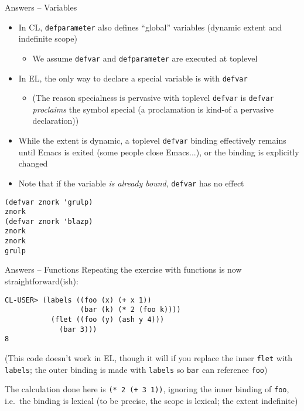 \documentclass[presentation]{beamer}
\begin{document}
\begin{frame}[fragile]{Answers -- Variables}
  \begin{itemize}
  \item In CL, \texttt{defparameter} also defines ``global'' variables (dynamic extent and indefinite scope)
    \begin{itemize}
    \item We assume \texttt{defvar} and \texttt{defparameter} are executed at toplevel
    \end{itemize}
  \item In EL, the only way to declare a special variable is with \texttt{defvar}
    \begin{itemize}
    \item (The reason specialness is pervasive with toplevel \texttt{defvar} is \texttt{defvar} \emph{proclaims} the symbol special (a proclamation is kind-of a pervasive declaration))
    \end{itemize}
  \item While the extent is dynamic, a toplevel \texttt{defvar} binding effectively remains until Emacs is exited (some people close Emacs...), or the binding is explicitly changed
  \item Note that if the variable \emph{is already bound}, \texttt{defvar} has no effect
  \end{itemize}
\begin{verbatim}
(defvar znork 'grulp)
znork
(defvar znork 'blazp)
znork
znork
grulp
\end{verbatim}
\end{frame}


\begin{frame}[fragile]{Answers -- Functions}
Repeating the exercise with functions is now straightforward(ish):
\begin{verbatim}
CL-USER> (labels ((foo (x) (+ x 1))
                  (bar (k) (* 2 (foo k))))
           (flet ((foo (y) (ash y 4)))
             (bar 3)))
8
\end{verbatim}
(This code doesn't work in EL, though it will if you replace the inner \texttt{flet} with \texttt{labels}; the outer binding is made with \texttt{labels} so \texttt{bar} can reference \texttt{foo})

\smallskip\noindent The calculation done here is \texttt{(* 2 (+ 3 1))}, ignoring the inner binding of \texttt{foo}, i.e.\ the binding is lexical (to be precise, the scope is lexical; the extent indefinite)
\end{frame}
\end{document}
